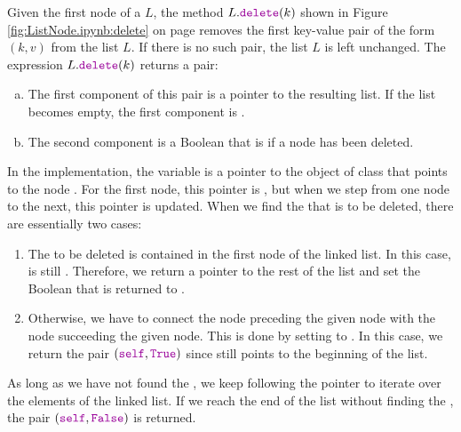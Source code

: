 Given the first node of a  $L$, the method $L.\mytt{delete}(k)$ shown in Figure
\ref{fig:ListNode.ipynb:delete} on page \pageref{fig:ListNode.ipynb:delete} removes the first
key-value pair of the form $(k, v)$ from the list $L$.  If there is no such pair, the list $L$ is left unchanged.
The expression  $L.\mytt{delete}(k)$ returns a pair:
\begin{enumerate}[(a)]
\item The first component of this pair is a pointer to the resulting list.  If the list becomes empty, the
      first component is .  
\item The second component is a Boolean that is  if a node has been deleted.
\end{enumerate}
In the implementation, the variable  is a pointer to the object of class 
that points to the node .  For the first node, this pointer is , but when we step
from one node to the next, this pointer is updated.  When we find the  that is to be deleted, there are
essentially two cases:
\begin{enumerate}
\item The  to be deleted is contained in the first node of the linked list.  In this case, 
      is still .  Therefore, we return a pointer to the rest of the list and set the Boolean
      that is returned to .
\item Otherwise, we have to connect the node preceding the given node with the node succeeding the given node.
      This is done by setting  to .
      In this case, we return the pair $(\mytt{self}, \mytt{True})$ since  still points to the
      beginning of the list.
\end{enumerate}
As long as we have not found the , we keep following the pointer  to iterate over the
elements of the linked list.  If we reach the end of the list without finding the , the pair
$(\mytt{self}, \mytt{False})$ is returned.


